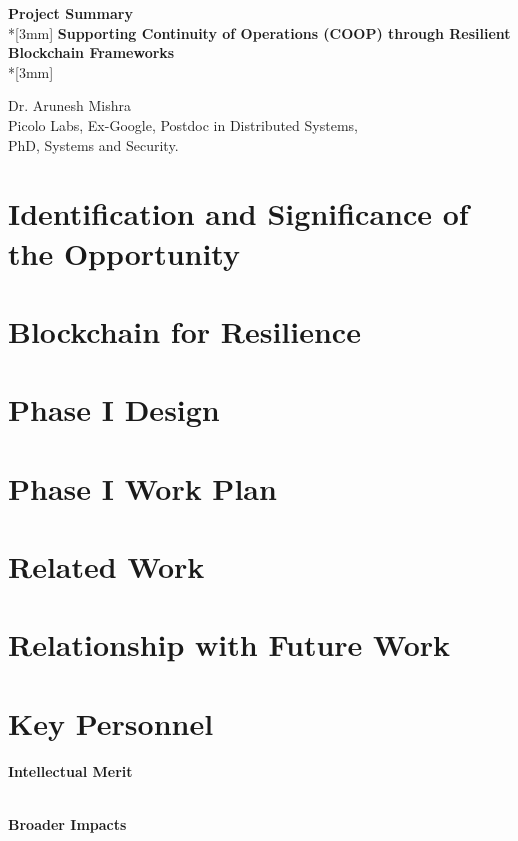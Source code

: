\documentclass{proposal}
\begin{document}
\begin{center}
{{\bf Project Summary}}\\*[3mm]
{\Large \bf Supporting Continuity of Operations (COOP) through Resilient Blockchain Frameworks } \\*[3mm]

Dr. Arunesh Mishra\\
Picolo Labs, Ex-Google, Postdoc in Distributed Systems,\\ PhD, Systems and Security.

\end{center}
\section{Identification and Significance of the Opportunity}

\cite{sample_ref}

\section{Blockchain for Resilience}


\section{Phase I Design}

\section{Phase I Work Plan}

\section{Related Work}



\section{Relationship with Future Work}


\section{Key Personnel}



\noindent
{\bf Intellectual Merit}

\ \\

\noindent
{\bf Broader Impacts}





\newpage
{}
\renewcommand{\thepage} {E--\arabic{page}}




%
\end{document}
